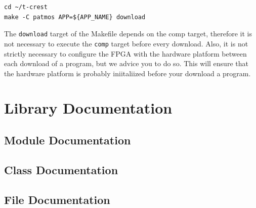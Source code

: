 \documentclass[a4paper,fontsize=10pt,twoside,DIV15,BCOR12mm,headinclude=true,footinclude=false,pagesize,bibtotoc]{scrbook}
\newcommand{\code}[1]{{\texttt{#1}}}
\begin{document}
\begin{Verbatim}
cd ~/t-crest
make -C patmos APP=${APP_NAME} download
\end{Verbatim}

The \code{download} target of the Makefile depends on the comp target,
therefore it is not necessary to execute the \code{comp} target before every download.
Also, it is not strictly necessary to configure the FPGA with the hardware
platform between each download of a program, but we advice you to do so.
This will ensure that the hardware platform is probably iniitaliized
before your download a program.


\chapter{Library Documentation}
\label{apx:api}
\section{Module Documentation}




\section{Class Documentation}



\section{File Documentation}







\end{document}
